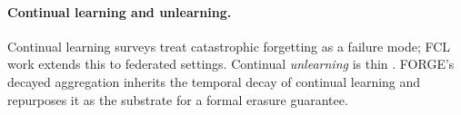 \paragraph{Continual learning and unlearning.}
Continual learning surveys \cite{parisi2019cl-survey,delange2022cl-survey} treat
catastrophic forgetting as a failure mode; FCL work \cite{yoon2021,dong2022fcl}
extends this to federated settings. Continual \emph{unlearning} is thin
\cite{shibata2021learning-to-forget}. FORGE's decayed aggregation inherits the
temporal decay of continual learning and repurposes it as the substrate for a formal
erasure guarantee.
